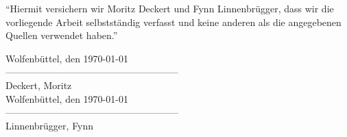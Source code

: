 
\noindent"`Hiermit versichern wir Moritz Deckert und Fynn Linnenbrügger, dass wir die vorliegende Arbeit selbstständig verfasst und keine anderen als die angegebenen Quellen verwendet haben."'
\vspace{8mm}\\
\begin{flushright}
	Wolfenbüttel, den \today
	\vspace{8mm}\\
	------------------------------------------------------\\
	Deckert, Moritz\\
	\vspace{8mm}
	Wolfenbüttel, den \today
	\vspace{8mm}\\
	------------------------------------------------------\\
	Linnenbrügger, Fynn\\
\end{flushright}
\vspace{8mm}

